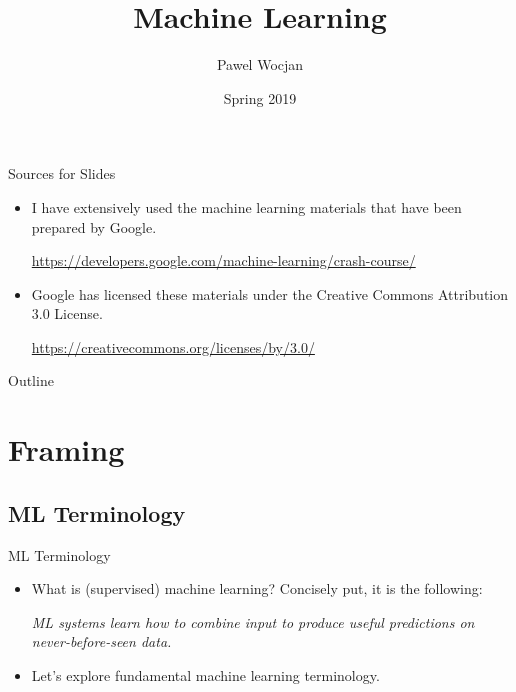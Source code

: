 \documentclass{beamer}
\title[ML]{Machine Learning}
\author{Pawel Wocjan}
\institute{University of Central Florida}
\date{Spring 2019}
\begin{document}
\begin{frame}
  \titlepage
\end{frame}

\begin{frame}{Sources for Slides}

\begin{itemize}
\item I have extensively used the machine learning materials that have been prepared by Google. 

\medskip
\footnotesize{ 
\url{https://developers.google.com/machine-learning/crash-course/}
}

\item Google has licensed these materials under the Creative Commons Attribution 3.0 License.

\medskip
\footnotesize{ 
\url{https://creativecommons.org/licenses/by/3.0/}
}
\end{itemize}
\end{frame}

\begin{frame}{Outline}
  \tableofcontents
\end{frame}

\section{Framing}

\subsection{ML Terminology}

\begin{frame}{ML Terminology}

\begin{itemize}
\item What is (supervised) machine learning? Concisely put, it is the following:

\medskip
\emph{ML systems learn how to combine input to produce useful predictions on never-before-seen data.}

\item Let's explore fundamental machine learning terminology.
\end{itemize}
\end{frame}

\end{document}
